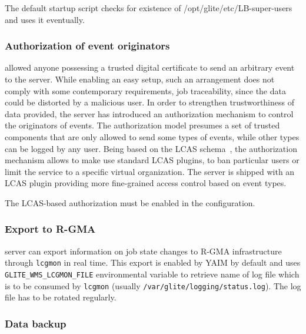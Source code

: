 The default startup script checks for existence of 
/opt/glite/etc/LB-super-users and uses it eventually.

\subsubsection{Authorization of event originators}
\LBold allowed anyone possessing a trusted digital certificate to send an
arbitrary event to the \LB server. While enabling an easy setup, such an
arrangement does not comply with some contemporary requirements, \eg job
traceability, since the data could be distorted by a malicious user.  In order
to strengthen trustworthiness of data provided, the \LBnew server has
introduced an authorization mechanism to control the originators of events.
The authorization model presumes a set of trusted components that are only
allowed to send some types of events, while other types can be logged by any
user. Being based on the LCAS schema~\cite{lcas}, the authorization mechanism
allows to make use standard LCAS plugins, \eg to ban particular users or limit
the service to a specific virtual organization. The \LB server is shipped with
an LCAS plugin providing more fine-grained access control based on event types.

The LCAS-based authorization must be enabled in the \LB configuration.



\subsubsection{Export to R-GMA}

{\sloppy
\LB server can export information on job state changes to R-GMA infrastructure through \verb'lcgmon' 
in real time. This export is enabled by YAIM by default and uses \verb'GLITE_WMS_LCGMON_FILE' 
environmental variable to retrieve name of log file which is to be consumed by \verb'lcgmon' (usually
\verb'/var/glite/logging/status.log'). The log file has to be rotated regularly.

}

\subsubsection{Data backup}
\label{inst:backup}

